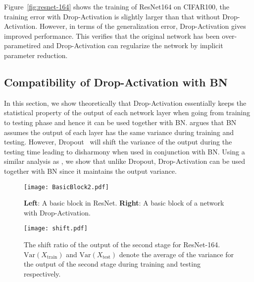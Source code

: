 \documentclass[11pt]{article}
\begin{document}
Figure~\ref{fig:resnet-164} shows the training of ResNet164 on CIFAR100, the training error with Drop-Activation is slightly larger than that without Drop-Activation. However, in terms of the generalization error, Drop-Activation gives improved performance. This verifies that the original network has been over-parametired and Drop-Activation can regularize the network by implicit parameter reduction.

\subsection{Compatibility of Drop-Activation with BN}
\label{subsec:harmony}
In this section, we show theoretically that Drop-Activation essentially keeps the statistical property of the output of each network layer when going from training to testing phase and hence it can be used together with BN. \cite{BNandDropout} argues that BN assumes the output of each layer has the same variance during training and testing. However, Dropout~\cite{dropout} will shift the variance of the output during the testing time leading to disharmony when used in conjunction with BN. Using a similar analysis as \cite{BNandDropout}, we show that unlike Dropout, Drop-Activation can be used together with BN since it maintains the output variance.

\begin{figure}[ht]
\centering
\begin{minipage}[t]{0.4\textwidth}
\vspace{0pt}
\texttt{[image: BasicBlock2.pdf]}
\caption{\textbf{Left}: A basic block in ResNet. \textbf{Right}: A basic block of a network with Drop-Activation. }
\label{fig:basicblock}
\end{minipage}
\hspace{.3in}
\begin{minipage}[t]{0.4\textwidth}
\vspace{0pt}
\texttt{[image: shift.pdf]}
\caption{The shift ratio of the output of the second stage for ResNet-164.
  $\text{Var}(X_\text{train})$ and $\text{Var}(X_\text{test})$ denote the average of the variance for the output of the second stage during training and testing respectively.}
\label{fig:var_shift}
\end{minipage}
\vspace{-0.4cm}
\end{figure}
\end{document}

